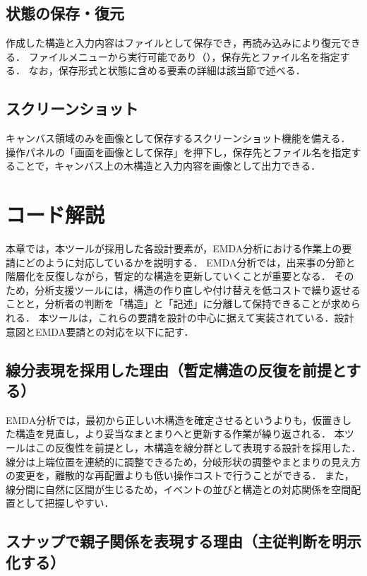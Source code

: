 \subsection{状態の保存・復元}

作成した構造と入力内容はファイルとして保存でき，再読み込みにより復元できる．
ファイルメニューから実行可能であり（），保存先とファイル名を指定する．
なお，保存形式と状態に含める要素の詳細は該当節で述べる．



\subsection{スクリーンショット}

キャンバス領域のみを画像として保存するスクリーンショット機能を備える．
操作パネルの「画面を画像として保存」を押下し，保存先とファイル名を指定することで，キャンバス上の木構造と入力内容を画像として出力できる．

\section{コード解説}

本章では，本ツールが採用した各設計要素が，EMDA分析における作業上の要請にどのように対応しているかを説明する．
EMDA分析では，出来事の分節と階層化を反復しながら，暫定的な構造を更新していくことが重要となる．
そのため，分析支援ツールには，構造の作り直しや付け替えを低コストで繰り返せることと，分析者の判断を「構造」と「記述」に分離して保持できることが求められる．
本ツールは，これらの要請を設計の中心に据えて実装されている．設計意図とEMDA要請との対応を以下に記す．

\subsection{線分表現を採用した理由（暫定構造の反復を前提とする）}

EMDA分析では，最初から正しい木構造を確定させるというよりも，仮置きした構造を見直し，より妥当なまとまりへと更新する作業が繰り返される．
本ツールはこの反復性を前提とし，木構造を線分群として表現する設計を採用した．
線分は上端位置を連続的に調整できるため，分岐形状の調整やまとまりの見え方の変更を，離散的な再配置よりも低い操作コストで行うことができる．
また，線分間に自然に区間が生じるため，イベントの並びと構造との対応関係を空間配置として把握しやすい．

\subsection{スナップで親子関係を表現する理由（主従判断を明示化する）}

